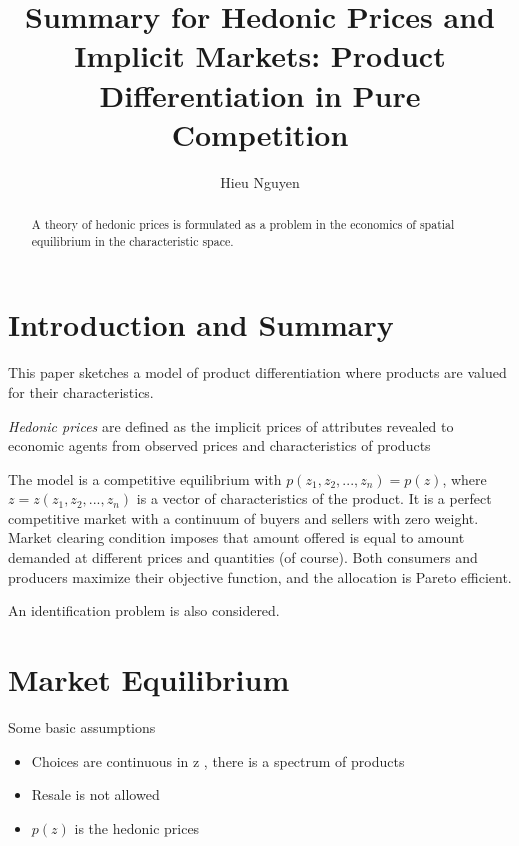 \documentclass[11pt]{article}
\begin{document}
\title{Summary for Hedonic Prices and Implicit Markets: Product Differentiation in Pure Competition }
\author{Hieu Nguyen}



\maketitle
\begin{abstract}
	 A theory of hedonic prices is formulated as a problem in the economics of spatial equilibrium in the characteristic space.
\end{abstract}




\section{Introduction and Summary}

This paper sketches a model of product differentiation where products are valued for their characteristics. 

\emph{Hedonic prices} are defined as the implicit prices of attributes revealed to economic agents from observed prices and characteristics of products

The model is a competitive equilibrium with $p\left( z_1, z_2, ... , z_n\right) = p\left(z\right)$, where $z = z\left( z_1, z_2, ..., z_n\right)$ is a vector of characteristics of the product. 
It is a perfect competitive market with a continuum of buyers and sellers with zero weight. Market clearing condition imposes that amount offered is equal to amount demanded at different prices and quantities (of course). Both consumers and producers maximize their objective function, and the allocation is Pareto efficient.

An identification problem is also considered.

\section{Market Equilibrium}
Some basic assumptions
\begin{itemize}
	\item Choices are continuous in z , there is a spectrum of products
	\item Resale is not allowed
	\item $p\left(z\right)$ is the hedonic prices 
\end{itemize}
\end{document}
